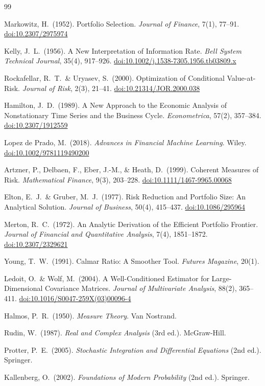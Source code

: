 \documentclass[12pt,openany]{book}
\numberwithin{equation}{chapter}
\theoremstyle{plain}
\theoremstyle{definition}
\theoremstyle{remark}
\numberwithin{equation}{chapter}
\theoremstyle{plain}
\begin{document}
\begin{thebibliography}{99}

Markowitz, H.\ (1952).
Portfolio Selection.
\textit{Journal of Finance}, 7(1), 77--91.
\href{https://doi.org/10.2307/2975974}{doi:10.2307/2975974}

Kelly, J.\ L.\ (1956).
A New Interpretation of Information Rate.
\textit{Bell System Technical Journal}, 35(4), 917--926.
\href{https://doi.org/10.1002/j.1538-7305.1956.tb03809.x}{doi:10.1002/j.1538-7305.1956.tb03809.x}

Rockafellar, R.\ T.\ \& Uryasev, S.\ (2000).
Optimization of Conditional Value-at-Risk.
\textit{Journal of Risk}, 2(3), 21--41.
\href{https://doi.org/10.21314/JOR.2000.038}{doi:10.21314/JOR.2000.038}

Hamilton, J.\ D.\ (1989).
A New Approach to the Economic Analysis of Nonstationary Time Series
and the Business Cycle.
\textit{Econometrica}, 57(2), 357--384.
\href{https://doi.org/10.2307/1912559}{doi:10.2307/1912559}

Lopez de Prado, M.\ (2018).
\textit{Advances in Financial Machine Learning}.
Wiley.
\href{https://doi.org/10.1002/9781119490200}{doi:10.1002/9781119490200}

Artzner, P., Delbaen, F., Eber, J.-M., \& Heath, D.\ (1999).
Coherent Measures of Risk.
\textit{Mathematical Finance}, 9(3), 203--228.
\href{https://doi.org/10.1111/1467-9965.00068}{doi:10.1111/1467-9965.00068}

Elton, E.\ J.\ \& Gruber, M.\ J.\ (1977).
Risk Reduction and Portfolio Size: An Analytical Solution.
\textit{Journal of Business}, 50(4), 415--437.
\href{https://doi.org/10.1086/295964}{doi:10.1086/295964}

Merton, R.\ C.\ (1972).
An Analytic Derivation of the Efficient Portfolio Frontier.
\textit{Journal of Financial and Quantitative Analysis}, 7(4), 1851--1872.
\href{https://doi.org/10.2307/2329621}{doi:10.2307/2329621}

Young, T.\ W.\ (1991).
Calmar Ratio: A Smoother Tool.
\textit{Futures Magazine}, 20(1).

Ledoit, O.\ \& Wolf, M.\ (2004).
A Well-Conditioned Estimator for Large-Dimensional Covariance Matrices.
\textit{Journal of Multivariate Analysis}, 88(2), 365--411.
\href{https://doi.org/10.1016/S0047-259X(03)00096-4}{doi:10.1016/S0047-259X(03)00096-4}

Halmos, P.\ R.\ (1950).
\textit{Measure Theory}.
Van Nostrand.

Rudin, W.\ (1987).
\textit{Real and Complex Analysis} (3rd ed.).
McGraw-Hill.

Protter, P.\ E.\ (2005).
\textit{Stochastic Integration and Differential Equations}
(2nd ed.).
Springer.

Kallenberg, O.\ (2002).
\textit{Foundations of Modern Probability} (2nd ed.).
Springer.

\end{thebibliography}
\end{document}
